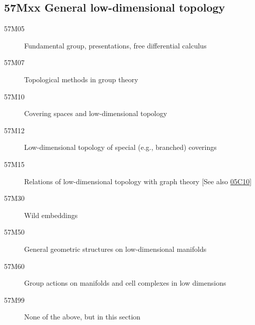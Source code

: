 \subsection*{57Mxx  General low-dimensional topology }\label{57Mxx}
\begin{description}  
\item [57M05]\label{57M05} Fundamental group, presentations, free differential calculus
\item [57M07]\label{57M07} Topological methods in group theory
\item [57M10]\label{57M10} Covering spaces and low-dimensional topology
\item [57M12]\label{57M12} Low-dimensional topology of special (e.g., branched) coverings
\item [57M15]\label{57M15} Relations of low-dimensional topology with graph theory [See also \hyperref[05C10]{05C10}]
\item [57M30]\label{57M30} Wild embeddings
\item [57M50]\label{57M50} General geometric structures on low-dimensional manifolds
\item [57M60]\label{57M60} Group actions on manifolds and cell complexes in low dimensions
\item [57M99]\label{57M99} None of the above, but in this section
\end{description}
